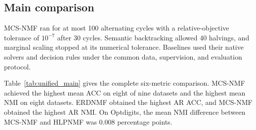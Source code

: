 \begin{landscape}
\subsection{Main comparison}

MCS-NMF ran for at most 100 alternating cycles with a relative-objective tolerance of $10^{-7}$ after 30 cycles. Semantic backtracking allowed 40 halvings, and marginal scaling stopped at its numerical tolerance. Baselines used their native solvers and decision rules under the common data, supervision, and evaluation protocol.

Table~\ref{tab:unified_main} gives the complete six-metric comparison. MCS-NMF achieved the highest mean ACC on eight of nine datasets and the highest mean NMI on eight datasets. ERDNMF obtained the highest AR ACC, and MCS-NMF obtained the highest AR NMI. On Optdigits, the mean NMI difference between MCS-NMF and HLPNMF was $0.008$ percentage points.


\end{landscape}
